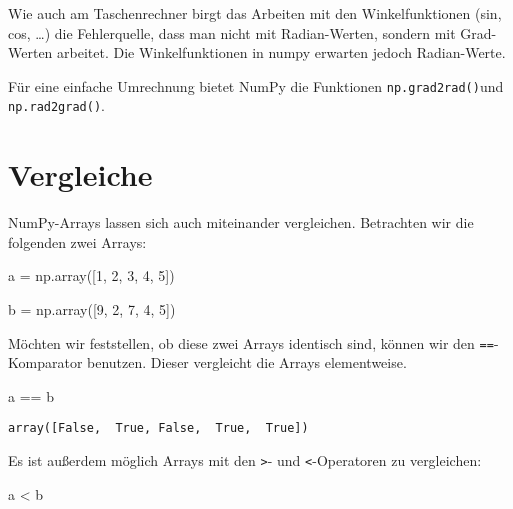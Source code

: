 \documentclass[
  letterpaper,
  DIV=11,
  numbers=noendperiod]{scrreprt}
\newenvironment{Shaded}{\begin{snugshade}}{\end{snugshade}}
\newcommand{\DecValTok}[1]{\textcolor[rgb]{0.68,0.00,0.00}{#1}}
\newcommand{\NormalTok}[1]{\textcolor[rgb]{0.00,0.23,0.31}{#1}}
\newcommand{\OperatorTok}[1]{\textcolor[rgb]{0.37,0.37,0.37}{#1}}
\begin{document}
\begin{tcolorbox}
\begin{tcolorbox}
Wie auch am Taschenrechner birgt das Arbeiten mit den Winkelfunktionen
(sin, cos, \ldots) die Fehlerquelle, dass man nicht mit Radian-Werten,
sondern mit Grad-Werten arbeitet. Die Winkelfunktionen in numpy erwarten
jedoch Radian-Werte.

Für eine einfache Umrechnung bietet NumPy die Funktionen
\texttt{np.grad2rad()}und \texttt{np.rad2grad()}.

\end{tcolorbox}

\section{Vergleiche}\label{vergleiche}

NumPy-Arrays lassen sich auch miteinander vergleichen. Betrachten wir
die folgenden zwei Arrays:

\begin{Shaded}
\begin{Highlighting}[]
\NormalTok{a }\OperatorTok{=}\NormalTok{ np.array([}\DecValTok{1}\NormalTok{, }\DecValTok{2}\NormalTok{, }\DecValTok{3}\NormalTok{, }\DecValTok{4}\NormalTok{, }\DecValTok{5}\NormalTok{])}

\NormalTok{b }\OperatorTok{=}\NormalTok{ np.array([}\DecValTok{9}\NormalTok{, }\DecValTok{2}\NormalTok{, }\DecValTok{7}\NormalTok{, }\DecValTok{4}\NormalTok{, }\DecValTok{5}\NormalTok{])}
\end{Highlighting}
\end{Shaded}

Möchten wir feststellen, ob diese zwei Arrays identisch sind, können wir
den \texttt{==}-Komparator benutzen. Dieser vergleicht die Arrays
elementweise.

\begin{Shaded}
\begin{Highlighting}[]
\NormalTok{a }\OperatorTok{==}\NormalTok{ b}
\end{Highlighting}
\end{Shaded}

\begin{verbatim}
array([False,  True, False,  True,  True])
\end{verbatim}

Es ist außerdem möglich Arrays mit den \texttt{\textgreater{}}- und
\texttt{\textless{}}-Operatoren zu vergleichen:

\begin{Shaded}
\begin{Highlighting}[]
\NormalTok{a }\OperatorTok{\textless{}}\NormalTok{ b}
\end{Highlighting}
\end{Shaded}


\end{tcolorbox}
\end{document}
